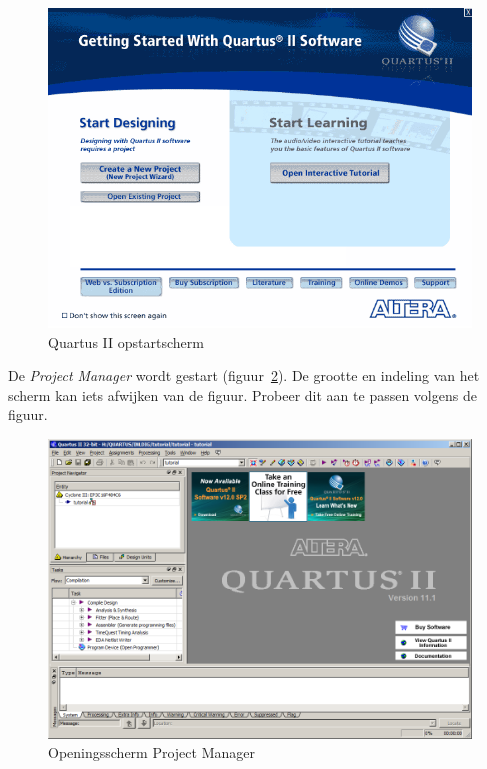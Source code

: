 \documentclass[a4paper,12pt,fleqn,twoside]{book}
\def\tutpicscale{0.455}
\begin{document}
\begin{figure}[H]
\centering
\includegraphics[scale=\tutpicscale]{011infoscreen.png}
\caption{Quartus II opstartscherm}
\label{fig:011infoscreen}
\end{figure}

De \textsl{Project Manager} wordt gestart
(figuur~\ref{fig:012quartusstartupscreen}).
De grootte en indeling van het scherm kan iets afwijken van de figuur. Probeer
dit aan te passen volgens de figuur. 

\begin{figure}[H]
\centering
\includegraphics[scale=\tutpicscale]{012quartusstartupscreen}
\caption{Openingsscherm Project Manager}
\label{fig:012quartusstartupscreen}
\end{figure}
\end{document}
